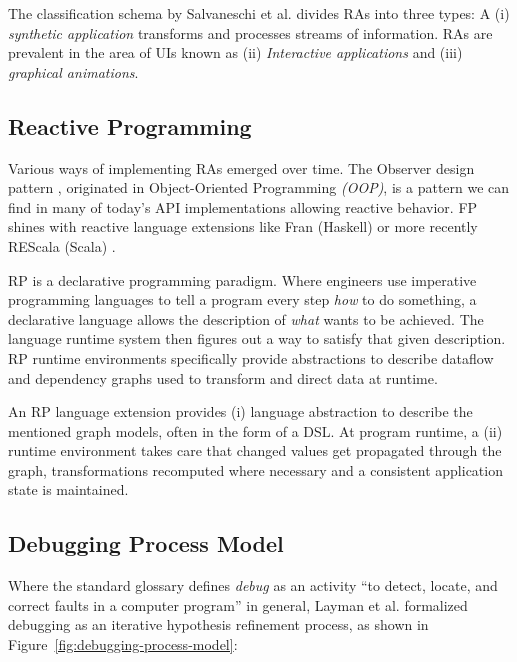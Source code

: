 \documentclass[12pt,a4paper]{article}
\begin{document}
The classification schema by Salvaneschi et al. \cite{7827078} divides RAs into three types: A (i) \emph{synthetic application} transforms and processes streams of information. RAs are prevalent in the area of UIs known as (ii) \emph{Interactive applications} and (iii) \emph{graphical animations}.

\subsection{Reactive Programming}

Various ways of implementing RAs emerged over time. The Observer design pattern \cite{gamma1995design}, originated in Object-Oriented Programming \emph{(OOP)}, is a pattern we can find in many of today's API implementations\cite{alabor:2019:reactiveappllications} allowing reactive behavior. FP shines with reactive language extensions like Fran (Haskell) \cite{10.1145/2501654.2501666} or more recently REScala (Scala) \cite{10.1145/2577080.2577083}.

RP is a declarative programming paradigm. Where engineers use imperative programming languages to tell a program every step \emph{how} to do something, a declarative language allows the description of \emph{what} wants to be achieved. The language runtime system then figures out a way to satisfy that given description. RP runtime environments specifically provide abstractions to describe dataflow and dependency graphs used to transform and direct data at runtime.

An RP language extension provides (i) language abstraction to describe the mentioned graph models, often in the form of a DSL\cite{10.1145/2577080.2577083}. At program runtime, a (ii) runtime environment takes care that changed values get propagated through the graph, transformations recomputed where necessary and a consistent application state is maintained.

\subsection{Debugging Process Model}

Where the standard glossary defines \emph{debug} as an activity ``to detect, locate, and correct faults in a computer program''\cite{ieeeglossary} in general, Layman et al. \cite{Layman_Diep_Nagappan_Singer_Deline_Venolia_2013} formalized debugging as an iterative hypothesis refinement process, as shown in Figure~\ref{fig:debugging-process-model}:
\end{document}
